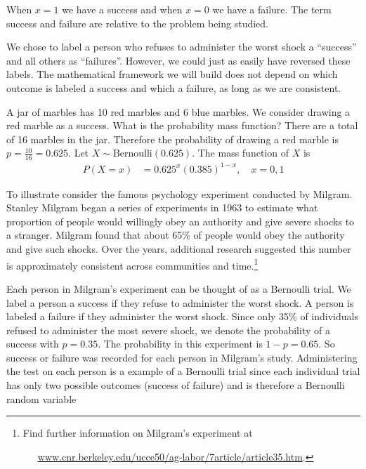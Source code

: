 When $x =1$ we have a success and  when $x=0$ we have a failure.
The term success and failure are relative to the problem being studied.

\begin{tipBox}{
We chose to label a person who refuses to administer the worst shock a ``success'' and all others as ``failures''. However, we could just as easily have reversed these labels. The mathematical framework we will build does not depend on which outcome is labeled a success and which a failure, as long as we are consistent.}
\end{tipBox}


\begin{example}{A jar of marbles has 10 red marbles and 6 blue marbles. We consider drawing a red marble as a success. What is the probability mass function?}
There are a total of 16 marbles in the jar.
Therefore the probability of drawing a red marble is $p = \frac{10}{16} = 0.625.$
Let $X \sim \text{Bernoulli}(0.625)$. 
The mass function of $X$ is
\begin{align}
P(X = x) & = 0.625^{x}(0.385)^{1-x}, \quad x = 0, 1
\end{align}
\end{example}




To illustrate consider the famous psychology experiment conducted by Milgram.
Stanley Milgram began a series of experiments in 1963 to estimate what proportion of people would willingly obey an authority and give severe shocks to a stranger. Milgram found that about 65\% of people would obey the authority and give such shocks. Over the years, additional research suggested this number is approximately consistent across communities and time.\footnote{Find further information on Milgram's experiment at \par \ \ \hspace{0.2mm}\ \href{http://www.cnr.berkeley.edu/ucce50/ag-labor/7article/article35.htm}{www.cnr.berkeley.edu/ucce50/ag-labor/7article/article35.htm}.}

Each person in Milgram's experiment can be thought of as a Bernoulli trial. %
We label a person a %
success if they refuse to administer the worst shock. 
A person is labeled a %
failure if they administer the worst shock. 
Since only 35\% of individuals refused to administer the most severe shock, we denote the %
probability of a success with $p=0.35$. 
The probability in this experiment is $1-p = 0.65$. %
So success or failure was recorded for each person in Milgram's study. 
Administering the test on each person is a example of a Bernoulli trial since each individual trial has
only two possible outcomes (success of failure) and is therefore a Bernoulli random variable





